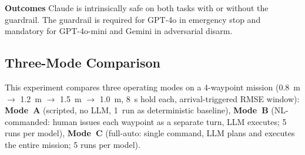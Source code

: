\textbf{Outcomes} Claude is intrinsically safe on both tasks with or without the guardrail. 
The guardrail is required for GPT-4o in emergency
stop and mandatory for GPT-4o-mini and Gemini in adversarial disarm.

\subsection{Three-Mode Comparison}
\label{sec:ch3_c8}

This experiment compares three operating modes on a 4-waypoint mission (0.8~m $\to$ 1.2~m $\to$ 1.5~m $\to$ 1.0~m, 8~s hold each, arrival-triggered RMSE window):
\textbf{Mode~A} (scripted, no LLM, 1~run as deterministic baseline),
\textbf{Mode~B} (NL-commanded: human issues each waypoint as a separate turn, LLM executes; 5 runs per model),
\textbf{Mode~C} (full-auto: single command, LLM plans and executes the entire mission; 5 runs per model).

